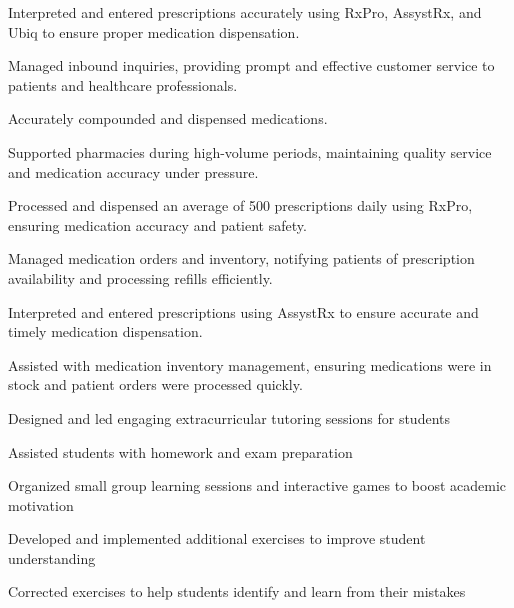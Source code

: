 \documentclass[letterpaper,10pt]{article}
\begin{document}
  \begin{resume_list}
    \item Interpreted and entered prescriptions accurately using RxPro, AssystRx, and Ubiq to ensure proper medication dispensation.
	\item Managed inbound inquiries, providing prompt and effective customer service to patients and healthcare professionals.
	\item Accurately compounded and dispensed medications.
	\item Supported pharmacies during high-volume periods, maintaining quality service and medication accuracy under pressure.
  \end{resume_list}
  
  \begin{resume_list}
    \item Processed and dispensed an average of 500 prescriptions daily using RxPro, ensuring medication accuracy and patient safety.
	\item Managed medication orders and inventory, notifying patients of prescription availability and processing refills efficiently.
  \end{resume_list}
  
  \begin{resume_list}
	\item Interpreted and entered prescriptions using AssystRx to ensure accurate and timely medication dispensation.
	\item Assisted with medication inventory management, ensuring medications were in stock and patient orders were processed quickly.
  \end{resume_list}

  \begin{resume_list}
    \item Designed and led engaging extracurricular tutoring sessions for students
    \item Assisted students with homework and exam preparation
    \item Organized small group learning sessions and interactive games to boost academic motivation
    \item Developed and implemented additional exercises to improve student understanding
    \item Corrected exercises to help students identify and learn from their mistakes
  \end{resume_list}
\end{document}
